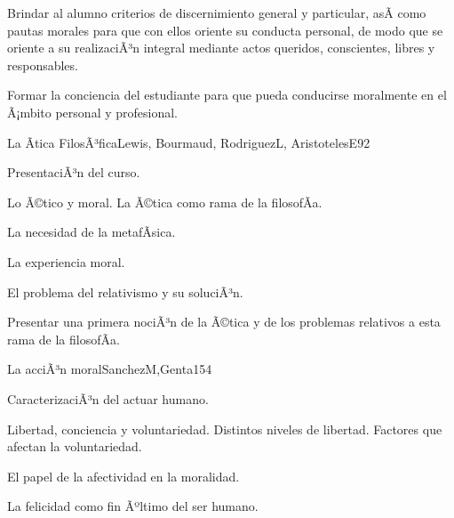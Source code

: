\begin{syllabus}


\begin{justification}
Brindar al alumno criterios de discernimiento general y particular, asÃ­ como pautas morales para que con ellos oriente su conducta personal, de modo que se oriente a su realizaciÃ³n integral mediante actos queridos, conscientes, libres y responsables. 
\end{justification}

\begin{goals}
\item Formar la conciencia del estudiante para que pueda conducirse moralmente en el Ã¡mbito personal y profesional.
\end{goals}

\begin{outcomes}
\end{outcomes}

\begin{unit}{La Ãtica FilosÃ³fica}{Lewis, Bourmaud, RodriguezL, AristotelesE}{9}{2}
\begin{topics}
	\item	PresentaciÃ³n del curso. 
	\item	Lo Ã©tico y moral. La Ã©tica como rama de la filosofÃ­a.
	\item	La necesidad de la metafÃ­sica.
	\item	La experiencia moral.
	\item	El problema del relativismo y su soluciÃ³n.
	
\end{topics}
\begin{unitgoals}
	\item Presentar una primera nociÃ³n de la Ã©tica y de los problemas relativos a esta rama de la filosofÃ­a.
\end{unitgoals}
\end{unit}

\begin{unit}{La acciÃ³n moral}{SanchezM,Genta}{15}{4}
\begin{topics}
	\item	CaracterizaciÃ³n del actuar humano. 
	\item	Libertad, conciencia y voluntariedad. Distintos niveles de libertad. Factores que afectan la voluntariedad.
	\item	El papel de la afectividad en la moralidad.
	\item	La felicidad como fin Ãºltimo del ser humano.


\end{topics}
\end{unit}
\end{syllabus}
